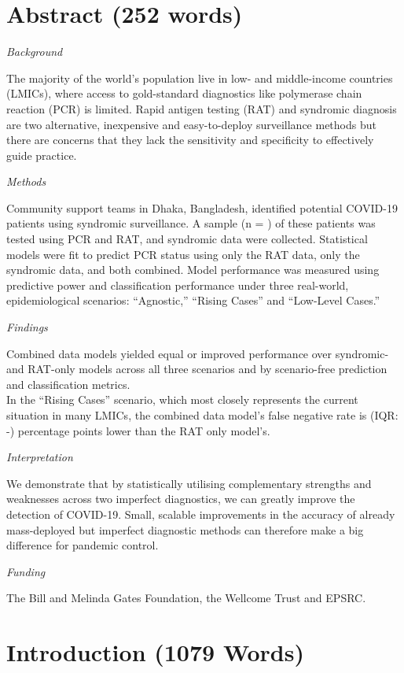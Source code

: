 \documentclass[]{elsarticle} %
\begin{document}
\hypertarget{abstract-252-words}{%
\section{Abstract (252 words)}\label{abstract-252-words}}

\emph{Background}

The majority of the world's population live in low- and middle-income countries (LMICs), where access to gold-standard diagnostics like polymerase chain reaction (PCR) is limited.
Rapid antigen testing (RAT) and syndromic diagnosis are two alternative, inexpensive and easy-to-deploy surveillance methods but there are concerns that they lack the sensitivity and specificity to effectively guide practice.

\emph{Methods}

Community support teams in Dhaka, Bangladesh, identified potential COVID-19 patients using syndromic surveillance.
A sample (n = ) of these patients was tested using PCR and RAT, and syndromic data were collected.
Statistical models were fit to predict PCR status using only the RAT data, only the syndromic data, and both combined.
Model performance was measured using predictive power and classification performance under three real-world, epidemiological scenarios: ``Agnostic,'' ``Rising Cases'' and ``Low-Level Cases.''

\emph{Findings}

Combined data models yielded equal or improved performance over syndromic- and RAT-only models across all three scenarios and by scenario-free prediction and classification metrics.\\
In the ``Rising Cases'' scenario, which most closely represents the current situation in many LMICs, the combined data model's false negative rate is  (IQR: -) percentage points lower than the RAT only model's.

\emph{Interpretation}

We demonstrate that by statistically utilising complementary strengths and weaknesses across two imperfect diagnostics, we can greatly improve the detection of COVID-19.
Small, scalable improvements in the accuracy of already mass-deployed but imperfect diagnostic methods can therefore make a big difference for pandemic control.

\emph{Funding}

The Bill and Melinda Gates Foundation, the Wellcome Trust and EPSRC.

\hypertarget{introduction-1079-words}{%
\section{Introduction (1079 Words)}\label{introduction-1079-words}}
\end{document}
